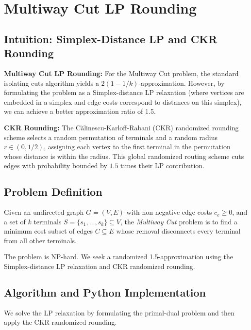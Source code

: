 \setcounter{chapter}{18}
\chapter{Multiway Cut LP Rounding}
\label{ch:multiway_rounding}

\section{Intuition: Simplex-Distance LP and CKR Rounding}

\begin{intuitionbox}
\textbf{Multiway Cut LP Rounding:} For the Multiway Cut problem, the standard isolating cuts algorithm yields a $2(1-1/k)$-approximation. However, by formulating the problem as a Simplex-distance LP relaxation (where vertices are embedded in a simplex and edge costs correspond to distances on this simplex), we can achieve a better approximation ratio of 1.5. 

\textbf{CKR Rounding:} The Călinescu-Karloff-Rabani (CKR) randomized rounding scheme selects a random permutation of terminals and a random radius $r \in (0, 1/2)$, assigning each vertex to the first terminal in the permutation whose distance is within the radius. This global randomized routing scheme cuts edges with probability bounded by $1.5$ times their LP contribution.
\end{intuitionbox}

\section{Problem Definition}
Given an undirected graph $G = (V, E)$ with non-negative edge costs $c_e \ge 0$, and a set of $k$ terminals $S = \{s_1, \dots, s_k\} \subseteq V$, the \emph{Multiway Cut} problem is to find a minimum cost subset of edges $C \subseteq E$ whose removal disconnects every terminal from all other terminals.

The problem is NP-hard. We seek a randomized 1.5-approximation using the Simplex-distance LP relaxation and CKR randomized rounding.

\section{Algorithm and Python Implementation}
We solve the LP relaxation by formulating the primal-dual problem and then apply the CKR randomized rounding.

